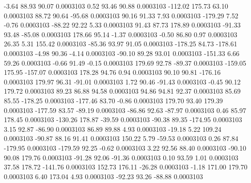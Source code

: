        -3.64       88.93       90.07     0.0003103
        0.52       93.46       90.88     0.0003103
     -112.02      175.73       63.10     0.0003103
       88.72       90.64      -95.68     0.0003103
       90.16       91.33        7.93     0.0003103
     -179.29        7.52       -0.76     0.0003103
      -88.22       92.22        5.33     0.0003103
       91.43       87.73      178.89     0.0003103
      -91.33       93.48      -85.08     0.0003103
      178.66       95.14       -1.37     0.0003103
       -0.50       86.80        0.97     0.0003103
       26.35        5.31      155.42     0.0003103
      -85.36       93.97       91.05     0.0003103
     -178.25       84.73     -178.61     0.0003103
       -4.98       90.36       -4.14     0.0003103
      -90.10       89.28       93.01     0.0003103
     -151.33        6.66       59.26     0.0003103
       -0.66       91.49       -0.15     0.0003103
      179.69       92.78      -89.37     0.0003103
     -159.05      175.95     -157.07     0.0003103
      178.28       94.76        0.94     0.0003103
       90.10       90.81     -176.16     0.0003103
      179.97       96.31      -91.01     0.0003103
        1.72       90.46      -91.43     0.0003103
       -0.45       90.12      179.72     0.0003103
       89.23       86.88       94.58     0.0003103
       94.86       94.81       92.37     0.0003103
       85.69       85.55     -178.25     0.0003103
     -177.46       83.70       -0.86     0.0003103
      179.70       93.40      179.39     0.0003103
     -177.59       83.57      -89.19     0.0003103
      -86.86       92.63      -87.97     0.0003103
        0.46       85.97      178.45     0.0003103
     -130.26      178.87      -39.59     0.0003103
      -90.38       89.35     -174.95     0.0003103
        3.15       92.87      -86.90     0.0003103
       86.89       89.88        4.93     0.0003103
      -19.18        5.22      109.24     0.0003103
      -90.87       88.16       91.41     0.0003103
      150.22        5.79      -59.53     0.0003103
        0.26       87.84     -179.95     0.0003103
     -179.59       92.25       -0.62     0.0003103
        3.22       92.56       88.40     0.0003103
      -90.10       90.08      179.76     0.0003103
      -91.28       92.06      -91.36     0.0003103
        0.10       93.59        1.01     0.0003103
       37.58      178.72     -141.76     0.0003103
      152.73      176.11      -26.28     0.0003103
       -1.18      171.00      179.70     0.0003103
        6.40      173.04        4.93     0.0003103
      -92.23       93.26      -88.88     0.0003103

